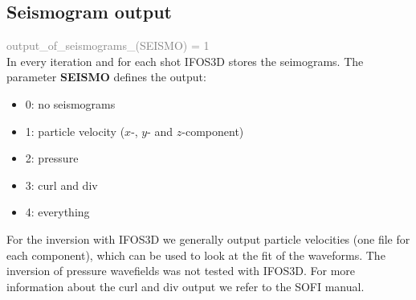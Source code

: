\subsection{Seismogram output}
\textcolor {Gray}{output\_of\_seismograms\_(SEISMO) = 1}\vspace{0.1cm}\\
In every iteration and for each shot IFOS3D stores the seimograms. The parameter \textbf{SEISMO} defines the output:
\begin{itemize}
 \item 0: no seismograms
 \item 1: particle velocity ($x$-, $y$- and $z$-component)
 \item 2: pressure
 \item 3: curl and div 
 \item 4: everything
\end{itemize}
For the inversion with IFOS3D we generally output particle velocities (one file for each component), which can be used to look at the fit of the waveforms. The inversion of pressure wavefields was not tested with IFOS3D. For more information about the curl and div output we refer to the SOFI manual.

